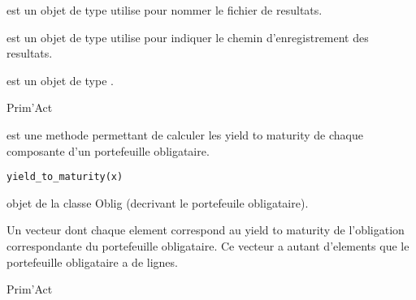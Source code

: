 \documentclass[a4paper]{book}
\begin{document}
%
\begin{Arguments}
\begin{ldescription}
\item[\code{nom\_run}] est un objet de type  utilise pour nommer le fichier de resultats.

\item[\code{path}] est un objet de type  utilise pour indiquer le chemin d'enregistrement des resultats.

\item[\code{x}] est un objet de type .
\end{ldescription}
\end{Arguments}
%
\begin{Author}\relax
Prim'Act
\end{Author}
%
\begin{Description}\relax
{} est une methode permettant de calculer les yield to maturity de chaque composante d'un portefeuille obligataire.
\end{Description}
%
\begin{Usage}
\begin{verbatim}
yield_to_maturity(x)
\end{verbatim}
\end{Usage}
%
\begin{Arguments}
\begin{ldescription}
\item[\code{x}] objet de la classe Oblig (decrivant le portefeuile obligataire).
\end{ldescription}
\end{Arguments}
%
\begin{Value}
Un vecteur dont chaque element correspond au yield to maturity de l'obligation correspondante du portefeuille obligataire.
Ce vecteur a autant d'elements que le portefeuille obligataire a de lignes.
\end{Value}
%
\begin{Author}\relax
Prim'Act
\end{Author}
\printindex{}
\end{document}
